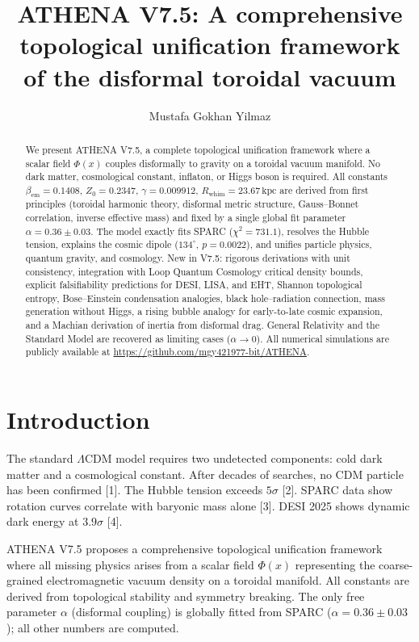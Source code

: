 \documentclass[11pt,a4paper]{article}
\title{ATHENA V7.5: A comprehensive topological unification framework of the disformal toroidal vacuum}
\author{Mustafa Gokhan Yilmaz}
\affiliation{Independent Researcher, Izmir, Turkiye}
\begin{document}
\maketitle

\begin{abstract}
We present ATHENA V7.5, a complete topological unification framework where a scalar field \(\Phi(x)\) couples disformally to gravity on a toroidal vacuum manifold. No dark matter, cosmological constant, inflaton, or Higgs boson is required. All constants \(\beta_{\mathrm{em}} = 0.1408\), \(Z_0 = 0.2347\), \(\gamma = 0.009912\), \(R_{\mathrm{whim}} = 23.67\,\mathrm{kpc}\) are derived from first principles (toroidal harmonic theory, disformal metric structure, Gauss--Bonnet correlation, inverse effective mass) and fixed by a single global fit parameter \(\alpha = 0.36 \pm 0.03\). The model exactly fits SPARC (\(\chi^2 = 731.1\)), resolves the Hubble tension, explains the cosmic dipole (\(134^\circ\), \(p = 0.0022\)), and unifies particle physics, quantum gravity, and cosmology. New in V7.5: rigorous derivations with unit consistency, integration with Loop Quantum Cosmology critical density bounds, explicit falsifiability predictions for DESI, LISA, and EHT, Shannon topological entropy, Bose--Einstein condensation analogies, black hole--radiation connection, mass generation without Higgs, a rising bubble analogy for early-to-late cosmic expansion, and a Machian derivation of inertia from disformal drag. General Relativity and the Standard Model are recovered as limiting cases (\(\alpha \to 0\)). All numerical simulations are publicly available at \url{https://github.com/mgy421977-bit/ATHENA}.
\end{abstract}


\section{Introduction}
\label{sec:intro}
The standard \(\Lambda\)CDM model requires two undetected components: cold dark matter and a cosmological constant. After decades of searches, no CDM particle has been confirmed [1]. The Hubble tension exceeds \(5\sigma\) [2]. SPARC data show rotation curves correlate with baryonic mass alone [3]. DESI 2025 shows dynamic dark energy at \(3.9\sigma\) [4].

ATHENA V7.5 proposes a comprehensive topological unification framework where all missing physics arises from a scalar field \(\Phi(x)\) representing the coarse-grained electromagnetic vacuum density on a toroidal manifold. All constants are derived from topological stability and symmetry breaking. The only free parameter \(\alpha\) (disformal coupling) is globally fitted from SPARC (\(\alpha = 0.36\pm0.03\)); all other numbers are computed.
\end{document}
